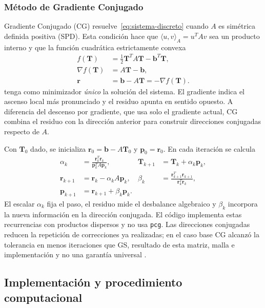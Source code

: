 \subsubsection{M\'etodo de Gradiente Conjugado}

Gradiente Conjugado (CG) resuelve~\eqref{eq:sistema-discreto} cuando $A$ es sim\'etrica definida positiva (SPD). Esta condici\'on hace que $\langle u,v\rangle_A=u^TAv$ sea un producto interno y que la funci\'on cuadr\'atica estrictamente convexa
\begin{equation}
\begin{aligned}
f(\mathbf{T})&=\tfrac12\mathbf{T}^TA\mathbf{T}-\mathbf{b}^T\mathbf{T},\\
\nabla f(\mathbf{T})&=A\mathbf{T}-\mathbf{b},\\
\mathbf{r}&=\mathbf{b}-A\mathbf{T}=-\nabla f(\mathbf{T}).
\end{aligned}
\end{equation}
tenga como minimizador \textit{\'unico} la soluci\'on del sistema. El gradiente indica el ascenso local m\'as pronunciado y el residuo apunta en sentido opuesto. A diferencia del descenso por gradiente, que usa solo el gradiente actual, CG combina el residuo con la direcci\'on anterior para construir direcciones conjugadas respecto de $A$.

Con $\mathbf{T}_0$ dado, se inicializa $\mathbf{r}_0=\mathbf{b}-A\mathbf{T}_0$ y $\mathbf{p}_0=\mathbf{r}_0$. En cada iteraci\'on se calcula
\begin{align}
\alpha_k&=\frac{\mathbf{r}_k^T\mathbf{r}_k}{\mathbf{p}_k^TA\mathbf{p}_k}, &
\mathbf{T}_{k+1}&=\mathbf{T}_k+\alpha_k\mathbf{p}_k,\\
\mathbf{r}_{k+1}&=\mathbf{r}_k-\alpha_kA\mathbf{p}_k, &
\beta_k&=\frac{\mathbf{r}_{k+1}^T\mathbf{r}_{k+1}}{\mathbf{r}_k^T\mathbf{r}_k},\\
\mathbf{p}_{k+1}&=\mathbf{r}_{k+1}+\beta_k\mathbf{p}_k.
\end{align}
El escalar $\alpha_k$ fija el paso, el residuo mide el desbalance algebraico y $\beta_k$ incorpora la nueva informaci\'on en la direcci\'on conjugada. El c\'odigo implementa estas recurrencias con productos dispersos y no usa \texttt{pcg}. Las direcciones conjugadas reducen la repetici\'on de correcciones ya realizadas; en el caso base CG alcanz\'o la tolerancia en menos iteraciones que GS, resultado de esta matriz, malla e implementaci\'on y no una garant\'ia universal \citep{zhang2001,xu2011poisson}.

\subsection{Implementaci\'on y procedimiento computacional}

